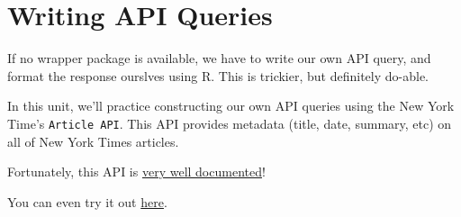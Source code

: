 \documentclass[]{book}
\newenvironment{Shaded}{\begin{snugshade}}{\end{snugshade}}
\newcommand{\CommentTok}[1]{\textcolor[rgb]{0.56,0.35,0.01}{\textit{#1}}}
\newcommand{\DataTypeTok}[1]{\textcolor[rgb]{0.13,0.29,0.53}{#1}}
\newcommand{\DecValTok}[1]{\textcolor[rgb]{0.00,0.00,0.81}{#1}}
\newcommand{\KeywordTok}[1]{\textcolor[rgb]{0.13,0.29,0.53}{\textbf{#1}}}
\newcommand{\NormalTok}[1]{#1}
\newcommand{\OperatorTok}[1]{\textcolor[rgb]{0.81,0.36,0.00}{\textbf{#1}}}
\newcommand{\OtherTok}[1]{\textcolor[rgb]{0.56,0.35,0.01}{#1}}
\newcommand{\StringTok}[1]{\textcolor[rgb]{0.31,0.60,0.02}{#1}}
\begin{document}
\begin{Shaded}
\end{Shaded}

\hypertarget{writing-api-queries}{%
\section{Writing API Queries}\label{writing-api-queries}}

If no wrapper package is available, we have to write our own API query, and format the response ourslves using R. This is trickier, but definitely do-able.

In this unit, we'll practice constructing our own API queries using the New York Time's \texttt{Article\ API}. This API provides metadata (title, date, summary, etc) on all of New York Times articles.

Fortunately, this API is \href{https://developer.nytimes.com/docs/articlesearch-product/1/overview}{very well documented}!

You can even try it out \href{http://developer.nytimes.com/io-docs}{here}.
\end{document}
